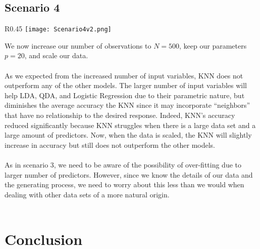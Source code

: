 \documentclass[11pt, oneside]{article}
\begin{document}
\subsection*{Scenario 4}
\begin{wrapfigure}[]{R}{0.45\textwidth}
\vspace{-0.55cm}
\texttt{[image: Scenario4v2.png]}
\vspace{-0.75cm}
\end{wrapfigure}
We now increase our number of observations to $N=500$, keep our parameters $p=20$, and scale our data.\\
\\
As we expected from the increased number of input variables, KNN does not outperform any of the other models. The larger number of input variables will help LDA, QDA, and Logistic Regression due to their parametric nature, but diminishes the average accuracy the KNN since it may incorporate ``neighbors'' that have no relationship to the desired response. Indeed, KNN’s accuracy reduced significantly because KNN struggles when there is a large data set and a large amount of predictors. Now, when the data is scaled, the KNN will slightly increase in accuracy but still does not outperform the other models.\\
\\
As in scenario 3, we need to be aware of the possibility of over-fitting due to larger number of predictors. However, since we know the details of our data and the generating process, we need to worry about this less than we would when dealing with other data sets of a more natural origin.\\
\\







\section*{Conclusion}
\end{document}
